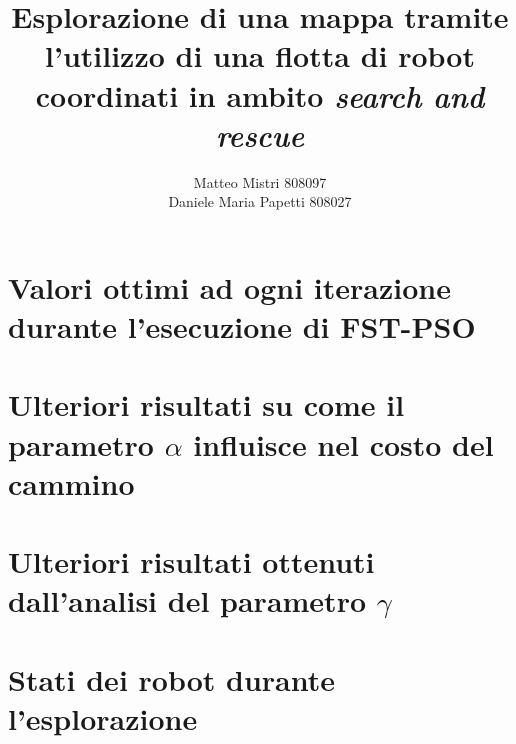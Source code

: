 \documentclass[a4paper,12pt]{report} %
\begin{document}
 

\title{Esplorazione di una mappa tramite l'utilizzo di una flotta di robot coordinati in ambito \textit{search and rescue}} 
\author{Matteo Mistri 808097\\ Daniele Maria Papetti 808027}

\maketitle
\tableofcontents







\begin{appendices}
	\chapter{Valori ottimi ad ogni iterazione durante l'esecuzione di FST-PSO}
	\label{apx:pso}
	
	\chapter{Ulteriori risultati su come il parametro $\alpha$ influisce nel costo del cammino}
	\label{apx:alpha}
	
	\chapter{Ulteriori risultati ottenuti dall'analisi del parametro $\gamma$}
	\label{apx:gamma}
	
	\chapter{Stati dei robot durante l'esplorazione}
	\label{apx:status}
	
\end{appendices}



\end{document}
